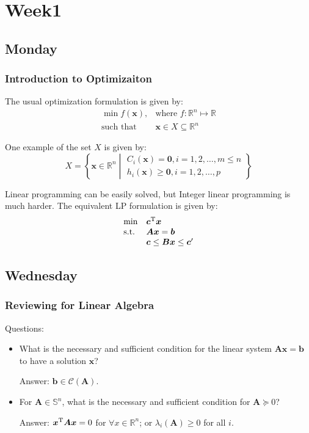 
\chapter{Week1}

\section{Monday}
\subsection{Introduction to Optimizaiton}
The usual optimization formulation is given by:
\[\begin{array}{ll}
\min f(\bm x),
&
\mbox{where }f:\mathbb{R}^n\mapsto\mathbb{R}
\\
\mbox{such that}
&
\bm x\in X\subseteq\mathbb{R}^n
\end{array}
\]

One example of the set $X$ is given by:
\[
X=\left\{\bm x\in\mathbb{R}^n\middle|
\begin{array}{l}
C_i(\bm x) = \bm0, i=1,2,\dots,m\le n
 \\
 h_i(\bm x)\ge\bm0, i=1,2,\dots,p
\end{array}\right\}
\]

Linear programming can be easily solved, but Integer linear programming is much harder. The equivalent LP formulation is given by:
\[
\begin{array}{ll}
\min
&
\bm c^{\mathrm T}\bm x
\\
\mbox{s.t.}
&
\bm{Ax}=\bm b
\\
&
\bm c\le\bm{Bx}\le \bm c'
\end{array}
\]



\section{Wednesday}

\subsection{Reviewing for Linear Algebra}
Questions:
\begin{itemize}
\item
What is the necessary and sufficient condition for the linear system $\bm A\bm x=\bm b$ to have a solution $\bm x$?

Answer: $\bm b\in\mathcal{C}(\bm A)$.
\item
For $\bm A\in\mathbb{S}^n$, what is the necessary and sufficient condition for $\bm A\succeq0$?

Answer: $\bm x^{\mathrm T}\bm A\bm x=0$ for $\forall x\in\mathbb{R}^n$; or $\lambda_i(\bm A)\ge0$ for all $i$.
\end{itemize}
